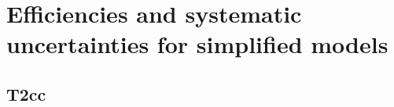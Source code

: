 \clearpage
\section{Efficiencies and systematic uncertainties for simplified models\label{app:signal}}

\subsection{T2cc\label{app:t2cc}}


